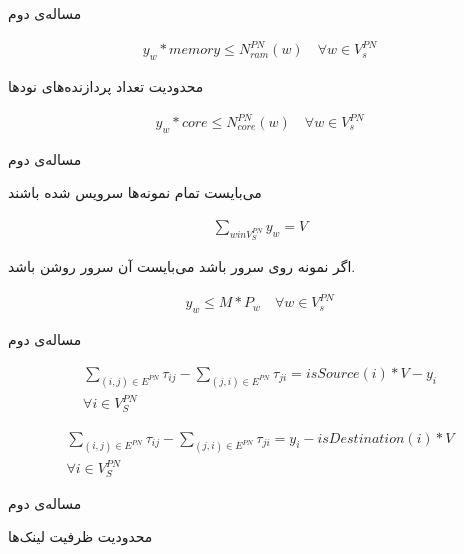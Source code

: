 \documentclass{beamer}
\begin{document}
\begin{persian}
\begin{frame}{مساله‌ی دوم}
\begin{latin}
\begin{align}
		y_{w} * memory \le N_{ram}^{PN}(w)
		\quad
		\forall w \in V_s^{PN}
		\end{align}\end{latin}
	\par
	محدودیت تعداد پردازنده‌های نودها
	\begin{latin}\begin{align}
		y_{w} * core \le N_{core}^{PN}(w)
		\quad
		\forall w \in V_s^{PN}
	\end{align}\end{latin}
\end{frame}
\begin{frame}{مساله‌ی دوم}
	\par
	می‌بایست تمام نمونه‌ها سرویس شده باشند
	\begin{latin}\begin{align}
		\sum_{w in V_{S}^{PN}} y_w = V
	\end{align}\end{latin}
	\par
	اگر نمونه روی سرور  باشد می‌بایست آن سرور روشن باشد.
	\begin{latin}\begin{align}
		y_w \le M * P_w
		\quad
		\forall w \in V_{s}^{PN}
	\end{align}\end{latin}
\end{frame}
\begin{frame}{مساله‌ی دوم}
	\par
	\begin{latin}\begin{align}
		\sum_{(i,j) \in E^{PN}} \tau_{ij} - \sum_{(j,i) \in E^{PN}} \tau_{ji} = isSource(i) * V - y_i \nonumber \\
		\forall i \in V_{S}^{PN}
	\end{align}\end{latin}
	\begin{latin}\begin{align}
		\sum_{(i,j) \in E^{PN}} \tau_{ij} - \sum_{(j,i) \in E^{PN}} \tau_{ji} = y_i - isDestination(i) * V \nonumber \\
		\forall i \in V_{S}^{PN}
	\end{align}\end{latin}
\end{frame}
\begin{frame}{مساله‌ی دوم}
	\par
	محدودیت ظرفیت لینک‌ها	
	\begin{latin}\begin{align}

\end{align}
\end{latin}
\end{frame}
\end{persian}
\end{document}
